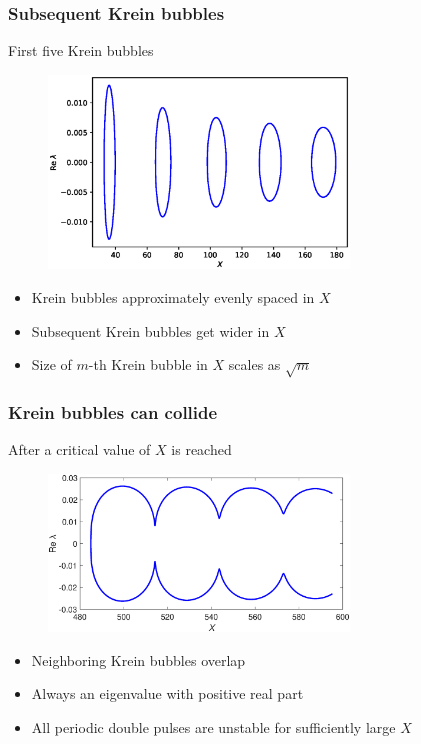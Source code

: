 \documentclass[16pt]{beamer}
\begin{document}
\begin{frame}
	\frametitle{Subsequent Krein bubbles}
	First five Krein bubbles
		\begin{figure}
		\begin{center}
		\includegraphics[width=8cm]{images/5bubbles.eps}
		\end{center}
		\end{figure}
	\begin{itemize}
		\item Krein bubbles approximately evenly spaced in $X$
		\item Subsequent Krein bubbles get wider in $X$
		\item Size of $m$-th Krein bubble in $X$ scales as $\sqrt{m}$
	\end{itemize}
\end{frame}

\begin{frame}
	\frametitle{Krein bubbles can collide}
	After a critical value of $X$ is reached
		\begin{figure}
		\begin{center}
		\includegraphics[width=8cm]{images/KreinBubbleCollision.eps}
		\end{center}
		\end{figure}
	\begin{itemize}
		\item Neighboring Krein bubbles overlap
		\item Always an eigenvalue with positive real part
		\item All periodic double pulses are unstable for sufficiently large $X$
	\end{itemize}
\end{frame}
\end{document}
